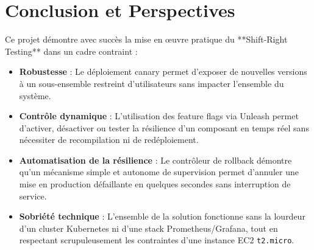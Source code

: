\documentclass[12pt,a4paper]{article}
\begin{document}
\section{Conclusion et Perspectives}

Ce projet démontre avec succès la mise en œuvre pratique du **Shift-Right Testing** dans un cadre contraint :
\begin{itemize}
    \item \textbf{Robustesse} : Le déploiement canary permet d'exposer de nouvelles versions à un sous-ensemble restreint d'utilisateurs sans impacter l'ensemble du système.
    \item \textbf{Contrôle dynamique} : L'utilisation des feature flags via Unleash permet d'activer, désactiver ou tester la résilience d'un composant en temps réel sans nécessiter de recompilation ni de redéploiement.
    \item \textbf{Automatisation de la résilience} : Le contrôleur de rollback démontre qu'un mécanisme simple et autonome de supervision permet d'annuler une mise en production défaillante en quelques secondes sans interruption de service.
    \item \textbf{Sobriété technique} : L'ensemble de la solution fonctionne sans la lourdeur d'un cluster Kubernetes ni d'une stack Prometheus/Grafana, tout en respectant scrupuleusement les contraintes d'une instance EC2 \texttt{t2.micro}.
\end{itemize}
\end{document}
